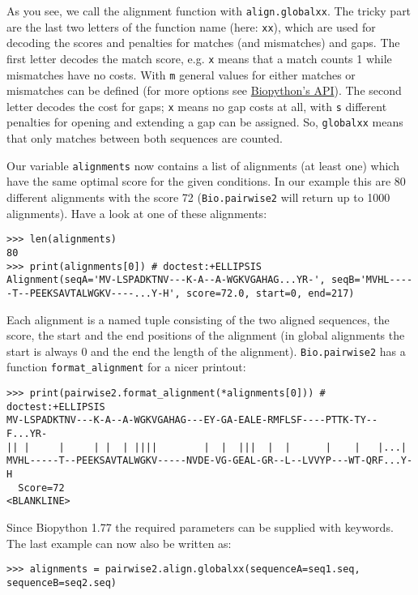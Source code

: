 As you see, we call the alignment function with \verb|align.globalxx|. The tricky
part are the last two letters of the function name (here: \texttt{xx}), which are
used for  decoding the scores and penalties for matches (and mismatches) and gaps.
The first letter decodes the match score, e.g. \texttt{x} means that a match counts
1 while mismatches have no costs. With \texttt{m} general values for either matches
or mismatches can be defined
(for more options see \href{http://biopython.org/docs/1.77/api/Bio.pairwise2.html}{Biopython's API}).
The second letter decodes the cost for gaps; \texttt{x} means no gap costs at all,
with \texttt{s} different penalties for opening and extending a gap can be assigned.
So, \verb|globalxx| means that only matches between both sequences are counted.

Our variable \texttt{alignments} now contains a list of alignments (at least one) which
have the same optimal score for the given conditions. In our example this are 80
different alignments with the score 72 (\verb|Bio.pairwise2| will return up to 1000
alignments). Have a look at one of these alignments:

\begin{verbatim}
>>> len(alignments)
80
>>> print(alignments[0]) # doctest:+ELLIPSIS
Alignment(seqA='MV-LSPADKTNV---K-A--A-WGKVGAHAG...YR-', seqB='MVHL-----T--PEEKSAVTALWGKV----...Y-H', score=72.0, start=0, end=217)
\end{verbatim}

Each alignment is a named tuple consisting of the two aligned sequences, the score, the
start and the end positions of the alignment (in global alignments the start is
always 0 and the end the length of the alignment). \verb|Bio.pairwise2| has a
function \verb|format_alignment| for a nicer printout:

\begin{verbatim}
>>> print(pairwise2.format_alignment(*alignments[0])) # doctest:+ELLIPSIS
MV-LSPADKTNV---K-A--A-WGKVGAHAG---EY-GA-EALE-RMFLSF----PTTK-TY--F...YR-
|| |     |     | |  | ||||        |  |  |||  |  |      |    |   |...|  
MVHL-----T--PEEKSAVTALWGKV-----NVDE-VG-GEAL-GR--L--LVVYP---WT-QRF...Y-H
  Score=72
<BLANKLINE>
\end{verbatim}

Since Biopython 1.77 the required parameters can be supplied with keywords. The
last example can now also be written as:

\begin{verbatim}
>>> alignments = pairwise2.align.globalxx(sequenceA=seq1.seq, sequenceB=seq2.seq)
\end{verbatim}

